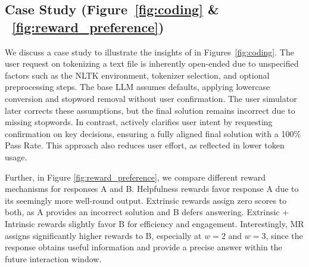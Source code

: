 
\subsection{Case Study (Figure~\ref{fig:coding} \& ~\ref{fig:reward_preference})}
\label{sec:case}
We discuss a case study to illustrate the insights of \name{} in Figures~\ref{fig:coding}.
The user request on tokenizing a text file is inherently open-ended due to unspecified factors such as the NLTK environment, tokenizer selection, and optional preprocessing steps. The base LLM assumes defaults, applying lowercase conversion and stopword removal without user confirmation. The user simulator later corrects these assumptions, but the final solution remains incorrect due to missing stopwords.
In contrast, \name{} actively clarifies user intent by requesting confirmation on key decisions, ensuring a fully aligned final solution with a 100\% Pass Rate. This approach also reduces user effort, as reflected in lower token usage.

Further, in Figure \ref{fig:reward_preference}, we compare different reward mechanisms for responses A and B. Helpfulness rewards favor response A due to its seemingly more well-round output. Extrinsic rewards assign zero scores to both, as A provides an incorrect solution and B defers answering. Extrinsic + Intrinsic rewards slightly favor B for efficiency and engagement. Interestingly, MR assigns significantly higher rewards to B, especially at $w=2$ and $w=3$, since the response obtains useful information and provide a precise answer within the future interaction window.


